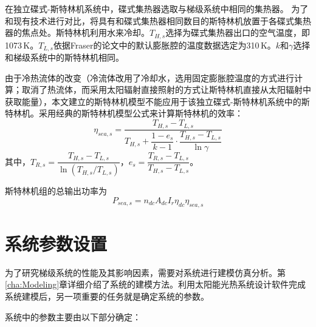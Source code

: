 在独立碟式-斯特林机系统中，碟式集热器选取与梯级系统中相同的集热器。
为了和现有技术进行对比，将具有和碟式集热器相同数目的斯特林机放置于各碟式集热器的焦点处。斯特林机利用水来冷却。$T_{H,s}$选择为碟式集热器出口的空气温度，即1073$\,\mathrm{K}$。$T_{L,s}$依据Fraser的论文\cite{Fraser2008}中的默认膨胀腔的温度数据选定为310$\,\mathrm{K}$。$k$和$\gamma$选择和梯级系统中的斯特林机相同。

由于冷热流体的改变（冷流体改用了冷却水，选用固定膨胀腔温度的方式进行计算；取消了热流体，而采用太阳辐射直接照射的方式让斯特林机直接从太阳辐射中获取能量），本文建立的斯特林机模型不能应用于该独立碟式-斯特林机系统中的斯特林机。采用经典的斯特林机模型公式来计算斯特林机的效率\cite{Stine1998}：
\begin{equation}
	\eta_{sea,s}=\dfrac{T_{H,s}-T_{L,s}}{T_{H,s}+\dfrac{1-e_{s}}{k-1}\cdot\dfrac{T_{H,s}-T_{L,s}}{\ln\gamma}}
\end{equation}
其中，$T_{R,s}=\dfrac{T_{H,s}-T_{L,s}}{\ln(T_{H,s}/T_{L,s})}$，$e_{s}=\dfrac{T_{R,s}-T_{L,s}}{T_{H,s}-T_{L,s}}$。

斯特林机组的总输出功率为
\begin{equation}
	P_{sea,s}=n_{dc}A_{dc}I_r\eta_{dc}\eta_{sea,s}
\end{equation}

\section{系统参数设置}

为了研究梯级系统的性能及其影响因素，需要对系统进行建模仿真分析。第\ref{cha:Modeling}章详细介绍了系统的建模方法。利用太阳能光热系统设计软件完成系统建模后，另一项重要的任务就是确定系统的参数。

系统中的参数主要由以下部分确定：


